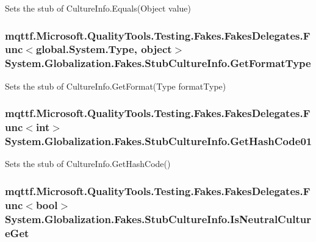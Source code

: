 Sets the stub of Culture\-Info.\-Equals(\-Object value)

\hypertarget{class_system_1_1_globalization_1_1_fakes_1_1_stub_culture_info_a6727b035f13af90bbd3eacec9b1112a5}{
\subsubsection[{Get\-Format\-Type}]{\setlength{\rightskip}{0pt plus 5cm}mqttf.\-Microsoft.\-Quality\-Tools.\-Testing.\-Fakes.\-Fakes\-Delegates.\-Func$<$global.\-System.\-Type, object$>$ System.\-Globalization.\-Fakes.\-Stub\-Culture\-Info.\-Get\-Format\-Type}}\label{class_system_1_1_globalization_1_1_fakes_1_1_stub_culture_info_a6727b035f13af90bbd3eacec9b1112a5}


Sets the stub of Culture\-Info.\-Get\-Format(\-Type format\-Type)

\hypertarget{class_system_1_1_globalization_1_1_fakes_1_1_stub_culture_info_ab8df98733098dbe6bfbdfb78d9580ad5}{
\subsubsection[{Get\-Hash\-Code01}]{\setlength{\rightskip}{0pt plus 5cm}mqttf.\-Microsoft.\-Quality\-Tools.\-Testing.\-Fakes.\-Fakes\-Delegates.\-Func$<$int$>$ System.\-Globalization.\-Fakes.\-Stub\-Culture\-Info.\-Get\-Hash\-Code01}}\label{class_system_1_1_globalization_1_1_fakes_1_1_stub_culture_info_ab8df98733098dbe6bfbdfb78d9580ad5}


Sets the stub of Culture\-Info.\-Get\-Hash\-Code()

\hypertarget{class_system_1_1_globalization_1_1_fakes_1_1_stub_culture_info_a1f0d9d312816268882dfb77135424bc5}{
\subsubsection[{Is\-Neutral\-Culture\-Get}]{\setlength{\rightskip}{0pt plus 5cm}mqttf.\-Microsoft.\-Quality\-Tools.\-Testing.\-Fakes.\-Fakes\-Delegates.\-Func$<$bool$>$ System.\-Globalization.\-Fakes.\-Stub\-Culture\-Info.\-Is\-Neutral\-Culture\-Get}}\label{class_system_1_1_globalization_1_1_fakes_1_1_stub_culture_info_a1f0d9d312816268882dfb77135424bc5}


